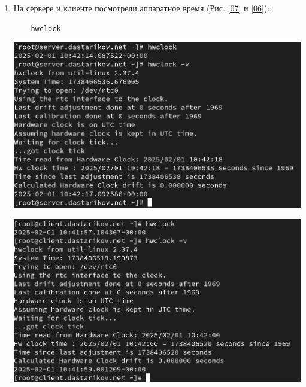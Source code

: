 \begin{enumerate}
\item На сервере и клиенте посмотрели аппаратное время (Рис. \ref{07} и \ref{06}):
  \begin{verbatim}
    hwclock
  \end{verbatim}
\begin{center}
    \centering
    \includegraphics[width=\textwidth]{../images/image07.png}
    \label{07}
\end{center}
\begin{center}
    \centering
    \includegraphics[width=\textwidth]{../images/image06.png}
    \label{06}
\end{center}
\end{enumerate}
